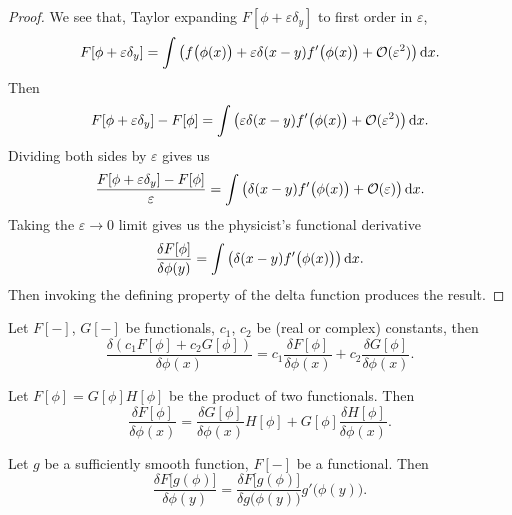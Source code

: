 \begin{proof}
We see that, Taylor expanding $F[\phi+\varepsilon\delta_{y}]$ to first
order in $\varepsilon$,
\begin{equation}
F[\phi+\varepsilon\delta_{y}]=\int\left(f\bigl(\phi(x)\bigr)+\varepsilon\delta(x-y)f'\bigl(\phi(x)\bigr)+\mathcal{O}(\varepsilon^{2})\right)\mathrm{d} x.
\end{equation}
Then
\begin{equation}
F[\phi+\varepsilon\delta_{y}]-F[\phi]=\int\left(\varepsilon\delta(x-y)f'\bigl(\phi(x)\bigr)+\mathcal{O}(\varepsilon^{2})\right)\mathrm{d} x.
\end{equation}
Dividing both sides by $\varepsilon$ gives us
\begin{equation}
\frac{F[\phi+\varepsilon\delta_{y}]-F[\phi]}{\varepsilon}=\int\left(\delta(x-y)f'\bigl(\phi(x)\bigr)+\mathcal{O}(\varepsilon)\right)\mathrm{d} x.
\end{equation}
Taking the $\varepsilon\to0$ limit gives us the physicist's functional derivative
\begin{equation}
\frac{\delta F[\phi]}{\delta\phi(y)}
=\int\left(\delta(x-y)f'\bigl(\phi(x)\bigr)\right)\mathrm{d} x.
\end{equation}
Then invoking the defining property of the delta function produces the result.
\end{proof}

\begin{theorem}[Linearity]
Let $F[-]$, $G[-]$ be functionals, $c_{1}$, $c_{2}$ be (real or complex)
constants, then
\begin{equation}
\frac{\delta(c_{1}F[\phi]+c_{2}G[\phi])}{\delta\phi(x)}
=c_{1}\frac{\delta F[\phi]}{\delta\phi(x)}
+c_{2}\frac{\delta G[\phi]}{\delta\phi(x)}.
\end{equation}
\end{theorem}

\begin{theorem}
Let $F[\phi]=G[\phi]H[\phi]$ be the product of two functionals.
Then
\begin{equation}
\frac{\delta F[\phi]}{\delta\phi(x)}
=\frac{\delta G[\phi]}{\delta\phi(x)}
H[\phi] + G[\phi]\frac{\delta H[\phi]}{\delta\phi(x)}.
\end{equation}
\end{theorem}

\begin{theorem}
Let $g$ be a sufficiently smooth function, $F[-]$ be a functional.
Then
\begin{equation}
\frac{\delta F\bigl[g(\phi)\bigr]}{\delta\phi(y)}
=\frac{\delta F\bigl[g(\phi)\bigr]}{\delta g\bigl(\phi(y)\bigr)}g'\bigl(\phi(y)\bigr).
\end{equation}
\end{theorem}

